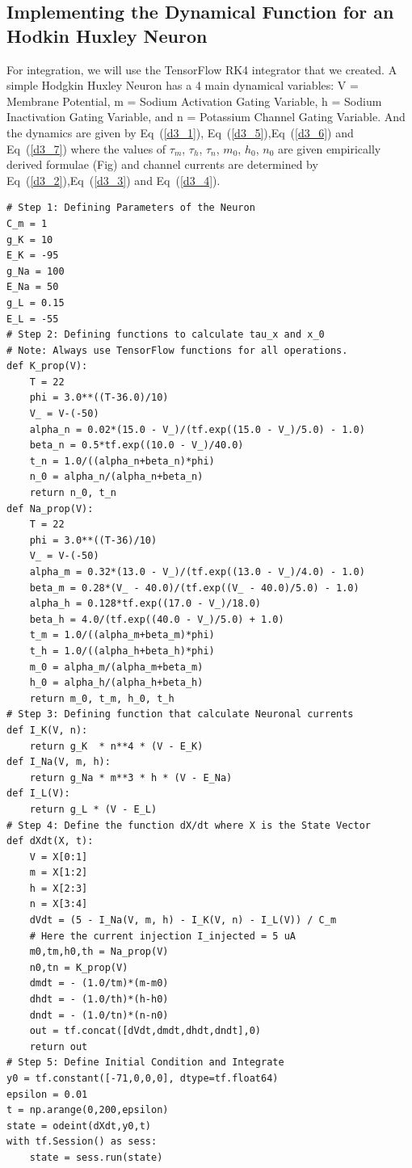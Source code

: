 \documentclass[10pt,letterpaper]{article}
\begin{document}
\subsection*{Implementing the Dynamical Function for an Hodkin Huxley Neuron}

For integration, we will use the TensorFlow RK4 integrator that we created. A simple Hodgkin Huxley Neuron has a 4 main dynamical variables: V = Membrane Potential, m = Sodium Activation Gating Variable, h = Sodium Inactivation Gating Variable, and n = Potassium Channel Gating Variable. And the dynamics are given by Eq~(\ref{d3_1}), Eq~(\ref{d3_5}),Eq~(\ref{d3_6}) and Eq~(\ref{d3_7}) where the values of $\tau_m$, $\tau_h$, $\tau_n$, $m_0$, $h_0$, $n_0$ are given empirically derived formulae (Fig) and channel currents are determined by Eq~(\ref{d3_2}),Eq~(\ref{d3_3}) and Eq~(\ref{d3_4}).

\begin{verbatim}
# Step 1: Defining Parameters of the Neuron 
C_m = 1
g_K = 10
E_K = -95
g_Na = 100
E_Na = 50 
g_L = 0.15
E_L = -55
# Step 2: Defining functions to calculate tau_x and x_0
# Note: Always use TensorFlow functions for all operations.
def K_prop(V):
    T = 22
    phi = 3.0**((T-36.0)/10)
    V_ = V-(-50)
    alpha_n = 0.02*(15.0 - V_)/(tf.exp((15.0 - V_)/5.0) - 1.0)
    beta_n = 0.5*tf.exp((10.0 - V_)/40.0) 
    t_n = 1.0/((alpha_n+beta_n)*phi)
    n_0 = alpha_n/(alpha_n+beta_n)
    return n_0, t_n
def Na_prop(V):
    T = 22
    phi = 3.0**((T-36)/10)
    V_ = V-(-50)
    alpha_m = 0.32*(13.0 - V_)/(tf.exp((13.0 - V_)/4.0) - 1.0)
    beta_m = 0.28*(V_ - 40.0)/(tf.exp((V_ - 40.0)/5.0) - 1.0)
    alpha_h = 0.128*tf.exp((17.0 - V_)/18.0)
    beta_h = 4.0/(tf.exp((40.0 - V_)/5.0) + 1.0)
    t_m = 1.0/((alpha_m+beta_m)*phi)
    t_h = 1.0/((alpha_h+beta_h)*phi)
    m_0 = alpha_m/(alpha_m+beta_m)
    h_0 = alpha_h/(alpha_h+beta_h)
    return m_0, t_m, h_0, t_h
# Step 3: Defining function that calculate Neuronal currents
def I_K(V, n):
    return g_K  * n**4 * (V - E_K)
def I_Na(V, m, h):
    return g_Na * m**3 * h * (V - E_Na)
def I_L(V):
    return g_L * (V - E_L)
# Step 4: Define the function dX/dt where X is the State Vector
def dXdt(X, t):
    V = X[0:1]
    m = X[1:2]
    h = X[2:3]
    n = X[3:4]
    dVdt = (5 - I_Na(V, m, h) - I_K(V, n) - I_L(V)) / C_m 
    # Here the current injection I_injected = 5 uA
    m0,tm,h0,th = Na_prop(V)
    n0,tn = K_prop(V)
    dmdt = - (1.0/tm)*(m-m0)
    dhdt = - (1.0/th)*(h-h0)
    dndt = - (1.0/tn)*(n-n0)
    out = tf.concat([dVdt,dmdt,dhdt,dndt],0)
    return out
# Step 5: Define Initial Condition and Integrate
y0 = tf.constant([-71,0,0,0], dtype=tf.float64)
epsilon = 0.01
t = np.arange(0,200,epsilon)
state = odeint(dXdt,y0,t)
with tf.Session() as sess:
    state = sess.run(state)
\end{verbatim}
\end{document}
